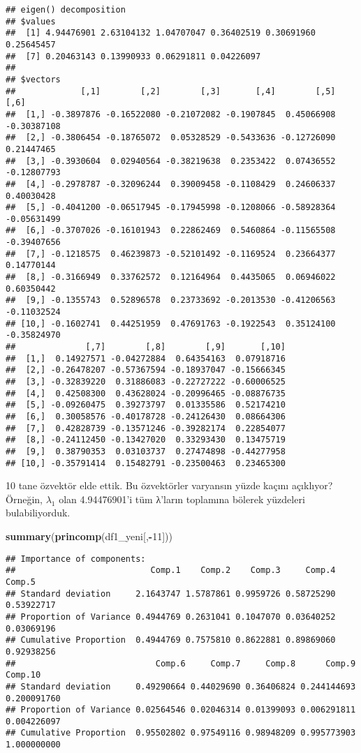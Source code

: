 \documentclass[
]{book}
\newenvironment{Shaded}{\begin{snugshade}}{\end{snugshade}}
\newcommand{\DecValTok}[1]{\textcolor[rgb]{0.00,0.00,0.81}{#1}}
\newcommand{\KeywordTok}[1]{\textcolor[rgb]{0.13,0.29,0.53}{\textbf{#1}}}
\newcommand{\NormalTok}[1]{#1}
\newcommand{\OperatorTok}[1]{\textcolor[rgb]{0.81,0.36,0.00}{\textbf{#1}}}
\begin{document}
\begin{verbatim}
## eigen() decomposition
## $values
##  [1] 4.94476901 2.63104132 1.04707047 0.36402519 0.30691960 0.25645457
##  [7] 0.20463143 0.13990933 0.06291811 0.04226097
## 
## $vectors
##             [,1]        [,2]        [,3]       [,4]        [,5]        [,6]
##  [1,] -0.3897876 -0.16522080 -0.21072082 -0.1907845  0.45066908 -0.30387108
##  [2,] -0.3806454 -0.18765072  0.05328529 -0.5433636 -0.12726090  0.21447465
##  [3,] -0.3930604  0.02940564 -0.38219638  0.2353422  0.07436552 -0.12807793
##  [4,] -0.2978787 -0.32096244  0.39009458 -0.1108429  0.24606337  0.40030428
##  [5,] -0.4041200 -0.06517945 -0.17945998 -0.1208066 -0.58928364 -0.05631499
##  [6,] -0.3707026 -0.16101943  0.22862469  0.5460864 -0.11565508 -0.39407656
##  [7,] -0.1218575  0.46239873 -0.52101492 -0.1169524  0.23664377  0.14770144
##  [8,] -0.3166949  0.33762572  0.12164964  0.4435065  0.06946022  0.60350442
##  [9,] -0.1355743  0.52896578  0.23733692 -0.2013530 -0.41206563 -0.11032524
## [10,] -0.1602741  0.44251959  0.47691763 -0.1922543  0.35124100 -0.35824970
##              [,7]        [,8]        [,9]       [,10]
##  [1,]  0.14927571 -0.04272884  0.64354163  0.07918716
##  [2,] -0.26478207 -0.57367594 -0.18937047 -0.15666345
##  [3,] -0.32839220  0.31886083 -0.22727222 -0.60006525
##  [4,]  0.42508300  0.43628024 -0.20996465 -0.08876735
##  [5,] -0.09260475  0.39273797  0.01335586  0.52174210
##  [6,]  0.30058576 -0.40178728 -0.24126430  0.08664306
##  [7,]  0.42828739 -0.13571246 -0.39282174  0.22854077
##  [8,] -0.24112450 -0.13427020  0.33293430  0.13475719
##  [9,]  0.38790353  0.03103737  0.27474898 -0.44277958
## [10,] -0.35791414  0.15482791 -0.23500463  0.23465300
\end{verbatim}

10 tane özvektör elde ettik. Bu özvektörler varyansın yüzde kaçını açıklıyor? Örneğin, \(λ_1\) olan 4.94476901'i tüm λ'ların toplamına bölerek yüzdeleri bulabiliyorduk.

\begin{Shaded}
\begin{Highlighting}[]
\KeywordTok{summary}\NormalTok{(}\KeywordTok{princomp}\NormalTok{(df1_yeni[,}\OperatorTok{-}\DecValTok{11}\NormalTok{]))}
\end{Highlighting}
\end{Shaded}

\begin{verbatim}
## Importance of components:
##                           Comp.1    Comp.2    Comp.3     Comp.4     Comp.5
## Standard deviation     2.1643747 1.5787861 0.9959726 0.58725290 0.53922717
## Proportion of Variance 0.4944769 0.2631041 0.1047070 0.03640252 0.03069196
## Cumulative Proportion  0.4944769 0.7575810 0.8622881 0.89869060 0.92938256
##                            Comp.6     Comp.7     Comp.8      Comp.9     Comp.10
## Standard deviation     0.49290664 0.44029690 0.36406824 0.244144693 0.200091760
## Proportion of Variance 0.02564546 0.02046314 0.01399093 0.006291811 0.004226097
## Cumulative Proportion  0.95502802 0.97549116 0.98948209 0.995773903 1.000000000
\end{verbatim}
\end{document}
